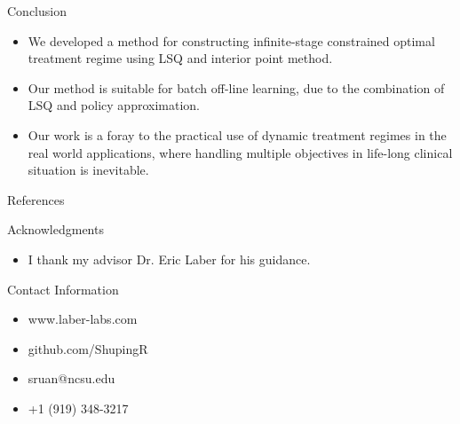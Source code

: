 \documentclass[final,hyperref={pdfpagelabels=false}]{beamer}
\begin{document}
\begin{frame}[t]
\begin{columns}[t]
\begin{column}{.465\textwidth}
\begin{block}{Conclusion}
\begin{itemize}
\item We developed a method for constructing infinite-stage constrained optimal treatment regime using LSQ and interior point method.
\item Our method is suitable for batch off-line learning, due to the combination of LSQ and policy  approximation.
\item Our work is a foray to the practical use of dynamic treatment regimes in the real world applications, where handling multiple objectives in life-long clinical situation is inevitable.
\end{itemize}
\end{block}


\begin{block}{References}
\nocite{*} %
\small{
	
	
}
\end{block}


\begin{block}{Acknowledgments}

\begin{itemize}
\item I thank my advisor Dr. Eric Laber for his guidance.
\end{itemize}

\end{block}



\begin{block}{Contact Information}

\begin{itemize}
\item www.laber-labs.com
\item github.com/ShupingR
\item sruan@ncsu.edu
\item +1 (919) 348-3217
\end{itemize}


\end{block}
\end{column}
\end{columns}
\end{frame}
\end{document}
